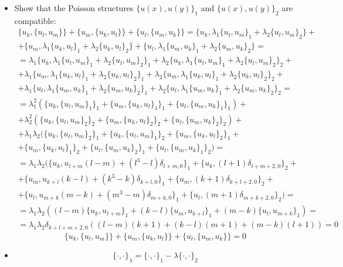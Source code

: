 \documentclass[12pt]{article}
\theoremstyle{definition}
\begin{document}
\begin{enumerate}
\begin{itemize}
        \item  Show that the Poisson structures $\{u(x),u(y)\}_1$ and $\{u(x),u(y)\}_2$ are compatible:
        \begin{multline}
            \{u_k,\{u_l,u_m\}\}+\{u_m,\{u_k,u_l\}\}+\{u_l,\{u_m,u_k\}\}=\{u_k,\lambda_1\{u_l,u_m\}_1+\lambda_2\{u_l,u_m\}_2\}+\\+\{u_m,\lambda_1\{u_k,u_l\}_1+\lambda_2\{u_k,u_l\}_2\}+\{u_l,\lambda_1\{u_m,u_k\}_1+\lambda_2\{u_m,u_k\}_2\}=\\=\lambda_1\{u_k,\lambda_1\{u_l,u_m\}_1+\lambda_2\{u_l,u_m\}_2\}_1+\lambda_2\{u_k,\lambda_1\{u_l,u_m\}_1+\lambda_2\{u_l,u_m\}_2\}_2+\\+\lambda_1\{u_m,\lambda_1\{u_k,u_l\}_1+\lambda_2\{u_k,u_l\}_2\}_1+\lambda_2\{u_m,\lambda_1\{u_k,u_l\}_1+\lambda_2\{u_k,u_l\}_2\}_2+\\+\lambda_1\{u_l,\lambda_1\{u_m,u_k\}_1+\lambda_2\{u_m,u_k\}_2\}_1+\lambda_2\{u_l,\lambda_1\{u_m,u_k\}_1+\lambda_2\{u_m,u_k\}_2\}_2=\\=\lambda_1^2(\{u_k,\{u_l,u_m\}_1\}_1+\{u_m,\{u_k,u_l\}_1\}_1+\{u_l,\{u_m,u_k\}_1\}_1)+\\+\lambda_2^2(\{u_k,\{u_l,u_m\}_2\}_2+\{u_m,\{u_k,u_l\}_2\}_2+\{u_l,\{u_m,u_k\}_2\}_2)+\\+\lambda_1\lambda_2(\{u_k,\{u_l,u_m\}_2\}_1+\{u_k,\{u_l,u_m\}_1\}_2+\{u_m,\{u_k,u_l\}_2\}_1+\\+\{u_m,\{u_k,u_l\}_1\}_2+\{u_l,\{u_m,u_k\}_2\}_1+\{u_l,\{u_m,u_k\}_1\}_2)=\\=\lambda_1\lambda_2(\{u_k,u_{l+m}(l-m)+(l^3-l)\delta_{l+m,0}\}_1+\{u_k,(l+1)\delta_{l+m+2,0}\}_2+\\+\{u_m,u_{k+l}(k-l)+(k^3-k)\delta_{k+l,0}\}_1+\{u_m,(k+1)\delta_{k+l+2,0}\}_2+\\+\{u_l,u_{m+k}(m-k)+(m^3-m)\delta_{m+k,0}\}_1+\{u_l,(m+1)\delta_{m+k+2,0}\}_2)=\\=\lambda_1\lambda_2((l-m)\{u_k,u_{l+m}\}_1+(k-l)\{u_m,u_{k+l}\}_1+(m-k)\{u_l,u_{m+k}\}_1)=\\=\lambda_1\lambda_2\delta_{k+l+m+2,0}((l-m)(k+1)+(k-l)(m+1)+(m-k)(l+1))=0
        \end{multline}
        \begin{equation}
            \boxed{\{u_k,\{u_l,u_m\}\}+\{u_m,\{u_k,u_l\}\}+\{u_l,\{u_m,u_k\}\}=0}
        \end{equation}
        \item
        \begin{equation}
            \{\cdot, \cdot\}_\lambda=\{\cdot, \cdot\}_1-\lambda\{\cdot, \cdot\}_2

\end{equation}
\end{itemize}
\end{enumerate}
\end{document}
